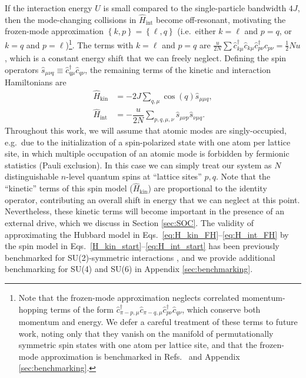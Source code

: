 \documentclass[aps,pra,nofootinbib,twocolumn,superscriptaddress]{revtex4-2}
\renewcommand{\t}{\text} %
\newcommand{\f}[2]{\dfrac{#1}{#2}} %
\newcommand{\p}[1]{\left(#1\right)} %
\renewcommand{\set}[1]{\left\{#1\right\}} %
\newcommand{\1}{\mathds{1}}
\renewcommand{\c}{\hat c}
\newcommand{\s}{\hat s}
\renewcommand{\H}{\hat H}
\begin{document}
If the interaction energy $U$ is small compared to the single-particle bandwidth $4J$, then the mode-changing collisions in $\H_{\t{int}}$ become off-resonant, motivating the frozen-mode approximation $\set{k,p}=\set{\ell,q}$ (i.e.~either $k=\ell$ and $p=q$, or $k=q$ and $p=\ell$)\footnote{Note that the frozen-mode approximation neglects correlated momentum-hopping terms of the form $\c_{\pi-p,\mu}^\dag \c_{\pi-q,\mu} \c_{p\nu}^\dag \c_{q\nu}$, which conserve both momentum and energy.
We defer a careful treatment of these terms to future work, noting only that they vanish on the manifold of permutationally symmetric spin states with one atom per lattice site, and that the frozen-mode approximation is benchmarked in Refs.~\cite{he2019engineering, smale2019observation} and Appendix \ref{sec:benchmarking}.}.
The terms with $k=\ell$ and $p=q$ are $\frac{u}{2N} \sum \c_{k\mu}^\dag \c_{k\mu} \c_{p\nu}^\dag \c_{p\nu} = \frac12 N u$, which is a constant  energy shift that we can freely neglect.
Defining the spin operators $\s_{\mu\nu q}\equiv \c_{q\mu}^\dag \c_{q\nu}$, the remaining terms of the kinetic and interaction Hamiltonians are
\begin{align}
  \H_{\t{kin}}
  &= -2J\sum_{q,\mu} \cos\p{q} \s_{\mu\mu q},
  \label{H_kin_start} \\
  \H_{\t{int}}
  &= -\f{u}{2N} \sum_{p,q,\mu,\nu} \s_{\mu\nu p} \s_{\nu\mu q}.
  \label{eq:H_int_start}
\end{align}
Throughout this work, we will assume that atomic modes are singly-occupied, e.g.~due to the initialization of a spin-polarized state with one atom per lattice site, in which multiple occupation of an atomic mode is forbidden by fermionic statistics (Pauli exclusion).
In this case we can simply treat our system as $N$ distinguishable $n$-level quantum spins at ``lattice sites'' $p,q$.
Note that the ``kinetic'' terms of this spin model ($\H_{\t{kin}}$) are proportional to the identity operator, contributing an overall shift in energy that we can neglect at this point.
Nevertheless, these kinetic terms will become important in the presence of an external drive, which we discuss in Section \ref{sec:SOC}.
The validity of approximating the Hubbard model in Eqs.~\eqref{eq:H_kin_FH}--\eqref{eq:H_int_FH} by the spin model in Eqs.~\eqref{H_kin_start}--\eqref{eq:H_int_start} has been previously benchmarked for SU(2)-symmetric interactions \cite{he2019engineering, smale2019observation}, and we provide additional benchmarking for SU(4) and SU(6) in Appendix \ref{sec:benchmarking}.
\end{document}
